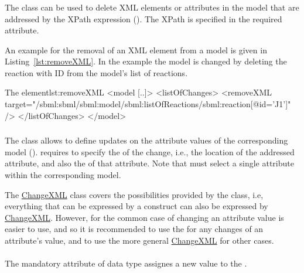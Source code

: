 \subsubsection{}
\label{class:removeXml}
The  class can be used to delete XML elements or attributes in the model that are addressed by the XPath expression (). The XPath is specified in the required \hyperref[sec:changeTarget]{} attribute.

An example for the removal of an XML element from a model is given in Listing~\ref{lst:removeXML}. In the example the model is changed by deleting the reaction with ID  from the model's list of reactions.

\begin{myXmlLst}{The  element}{lst:removeXML}
<model [..]>
	<listOfChanges>
		<removeXML target="/sbml:sbml/sbml:model/sbml:listOfReactions/sbml:reaction[@id='J1']" />
	</listOfChanges>
</model>
\end{myXmlLst}


\subsubsection{}
\label{class:changeAttribute}
The  class allows to define updates on the attribute values of the corresponding model ().  requires to specify the \hyperref[sec:changeTarget]{} of the change, i.e., the location of the addressed attribute, and also the \hyperref[sec:newValue]{} of that attribute. Note that  must select a single attribute within the corresponding model.

The \hyperref[class:changeXml]{ChangeXML} class covers the possibilities provided by the  class, i.e, everything that can be expressed by a  construct can also be expressed by \hyperref[class:changeXml]{ChangeXML}. However, for the common case of changing an attribute value  is easier to use, and so it is recommended to use the  for any changes of an attribute's value, and to use the more general \hyperref[class:changeXml]{ChangeXML} for other cases.


\paragraph*{}
\label{sec:newValue}
The mandatory  attribute of data type  assignes a new value to the .

